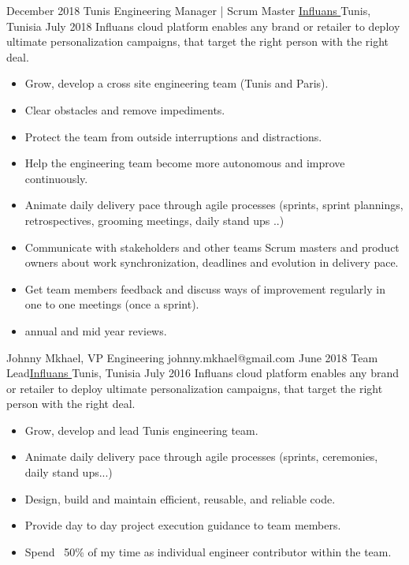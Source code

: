 \begin{experiences}
  \emptySeparator  
  \experienceWithReferenceNoTechno
  {December 2018}       
  {Tunis Engineering Manager | Scrum Master}
  {\href{https://www.influans.com}
  {Influans \faExternalLink}}
  {Tunis, Tunisia}
  {July 2018}
  {Influans cloud platform enables any brand or retailer to deploy ultimate personalization campaigns, that target the right person with the right deal.}
    {
      \begin{itemize}
        \item Grow, develop a cross site engineering team (Tunis and Paris).
        \item Clear obstacles and remove impediments.
        \item Protect the team from outside interruptions and distractions.
        \item Help the engineering team become more autonomous and improve continuously.
        \item Animate daily delivery pace through agile processes (sprints, sprint plannings, retrospectives, grooming meetings, daily stand ups ..)
        \item Communicate with stakeholders and other teams Scrum masters and product owners about work synchronization, deadlines and evolution in delivery pace.
        \item Get team members feedback and discuss ways of improvement regularly in one to one meetings (once a sprint).
        \item annual and mid year reviews.
      \end{itemize}
    }
    {Johnny Mkhael, VP Engineering} {johnny.mkhael@gmail.com}
  \emptySeparator   
  \experienceWithReferenceNoTechno
    {June 2018}       {Team Lead}{\href{https://www.influans.com}{Influans \faExternalLink}}{Tunis, Tunisia}
    {July 2016}      {Influans cloud platform enables any brand or retailer to deploy ultimate personalization campaigns, that target the right person with the right deal.}
    {
      \begin{itemize}
        \item Grow, develop and lead Tunis engineering team.
        \item Animate daily delivery pace through agile processes (sprints, ceremonies, daily stand ups...)
        \item Design, build and maintain efficient, reusable, and reliable code.
        \item Provide day to day project execution guidance to team members.
        \item Spend ~50\% of my time as individual engineer contributor within the team.

\end{itemize}}
\end{experiences}
